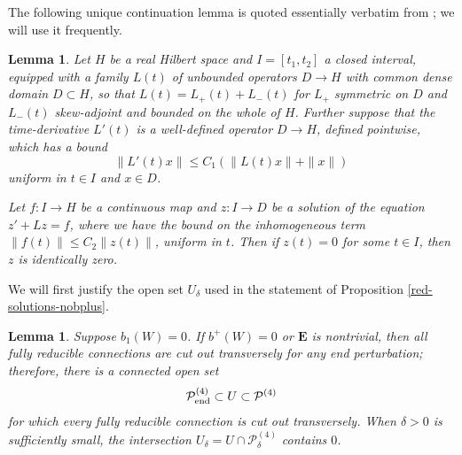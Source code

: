 \documentclass[10pt,a4paper]{amsart}
\newtheorem{lemma}[theorem]{Lemma}
\theoremstyle{definition}
\theoremstyle{remark}
\numberwithin{figure}{qchap}
\begin{document}
The following unique continuation lemma is quoted essentially verbatim from \cite[Lemma~7.1.3]{KMSW}; we will use it frequently.

\begin{lemma}\label{Unique}Let $H$ be a real Hilbert space and $I = [t_1, t_2]$ a closed interval, equipped with a family $L(t)$ of unbounded operators $D \to H$ with common dense domain $D\subset H$, so that $L(t) = L_+(t) + L_-(t)$ for $L_+$ symmetric on $D$ and $L_-(t)$ skew-adjoint and bounded on the whole of $H$. Further suppose that the time-derivative $L'(t)$ is a well-defined operator $D \to H$, defined pointwise, which has a bound $$\|L'(t)x\| \leq C_1(\|L(t)x\| + \|x\|)$$ uniform in $t\in I$ and $x \in D$.

Let $f: I \to H$ be a continuous map and $z: I \to D$ be a solution of the equation $z' + Lz = f$, where we have the bound on the inhomogeneous term $\|f(t)\| \leq C_2\|z(t)\|$, uniform in $t$. Then if $z(t) = 0$ for some $t \in I$, then $z$ is identically zero.
\end{lemma}

We will first justify the open set $U_\delta$ used in the statement of Proposition \ref{red-solutions-nobplus}.

\begin{lemma}\label{Trivial-transverse}Suppose $b_1(W) = 0$. If $b^+(W) = 0$ or $\mathbf{E}$ is nontrivial, then all fully reducible connections are cut out transversely for any end perturbation; therefore, there is a connected open set 
$$\mathcal P^{(4)}_{\textup{end}} \subset U\subset \mathcal P^{(4)}$$
for which every fully reducible connection is cut out transversely. When $\delta > 0$ is sufficiently small, the intersection $U_\delta = U \cap \mathcal P^{(4)}_\delta$ contains $0$.
\end{lemma}
\end{document}
